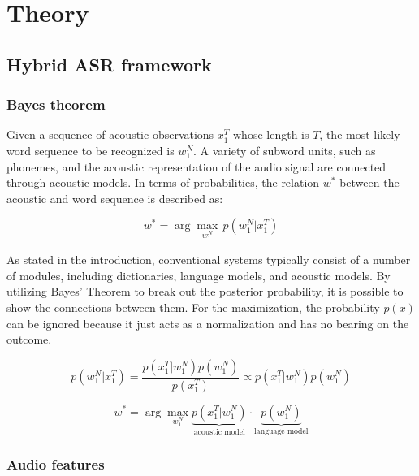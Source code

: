 \chapter{Theory}
\label{ch: Theory}


\section{Hybrid ASR framework}

\subsection{Bayes theorem}

Given a sequence of acoustic observations $x_{1}^{T}$ whose length is $T$,  the most likely word sequence to be recognized is $w_{1}^{N}$.
A variety of subword units, such as phonemes, and the acoustic representation of the audio signal are connected through acoustic models.
In terms of probabilities, the relation $w^{*}$ between the acoustic and word sequence is described as: 

\begin{equation}
    w^{*} = \operatorname{arg}\max_{w_1^N} \, p(w_{1}^{N}|x_{1}^{T})
\end{equation}

As stated in the introduction, conventional  systems typically consist of a number of modules, including dictionaries, language models, and acoustic models.
By utilizing Bayes' Theorem to break out the posterior probability, it is possible to show the connections between them.
For the maximization, the probability $p(x)$ can be ignored because it just acts as a normalization and has no bearing on the outcome.

\begin{equation}
    p(w_{1}^{N}|x_{1}^{T}) = \frac{p(x_{1}^{T}|w_{1}^{N})p(w_{1}^{N})}{p(x_{1}^{T})} \propto p(x_{1}^{T}|w_{1}^{N})p(w_{1}^{N})
\end{equation}

\begin{equation}
w^{*} = \operatorname{arg}\max_{w_1^N}  \underbrace{p(x_{1}^{T}|w_{1}^{N})}_{\text{acoustic model}}\cdot\underbrace{p(w_{1}^{N})}_{\text{language model}}
\end{equation}

\subsection{Audio features}

